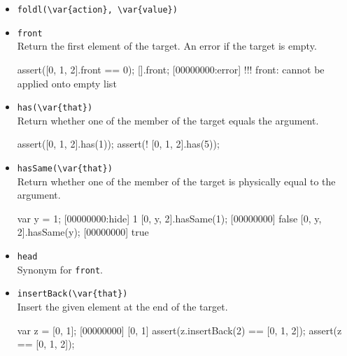 \begin{itemize}
\item \lstinline|foldl(\var{action}, \var{value})|\\


\begin{urbiscript}[firstnumber=last]

\end{urbiscript}

\item \lstinline|front|\\
Return the first element of the target. An error if the target is
empty.

\begin{urbiscript}[firstnumber=last]
assert([0, 1, 2].front == 0);
[].front;
[00000000:error] !!! front: cannot be applied onto empty list
\end{urbiscript}

\item \lstinline|has(\var{that})|\\
Return whether one of the member of the target equals the argument.

\begin{urbiscript}[firstnumber=last]
assert([0, 1, 2].has(1));
assert(! [0, 1, 2].has(5));
\end{urbiscript}

\item \lstinline|hasSame(\var{that})|\\

Return whether one of the member of the target is physically equal to
the argument.

\begin{urbiscript}[firstnumber=last]
var y = 1;
[00000000:hide] 1
[0, y, 2].hasSame(1);
[00000000] false
[0, y, 2].hasSame(y);
[00000000] true
\end{urbiscript}

\item \lstinline|head|\\
  Synonym for \lstinline|front|.

\item \lstinline|insertBack(\var{that})|\\
  Insert the given element at the end of the target.

\begin{urbiscript}[firstnumber=last]
var z = [0, 1];
[00000000] [0, 1]
assert(z.insertBack(2) == [0, 1, 2]);
assert(z == [0, 1, 2]);
\end{urbiscript}


\end{itemize}
